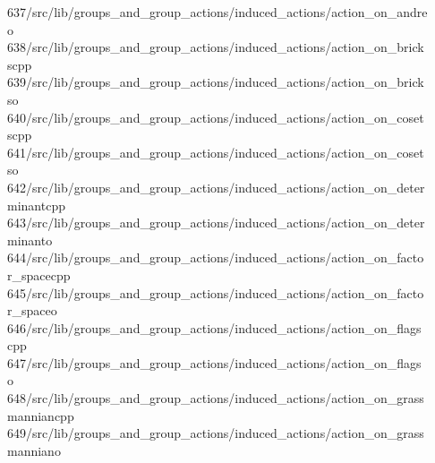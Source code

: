 \begin{tabbing}
637\>/src/lib/groups\_and\_group\_actions/induced\_actions/action\_on\_andre\\[0pt]
\>o\\[0pt]
638\>/src/lib/groups\_and\_group\_actions/induced\_actions/action\_on\_brick\\[0pt]
\>scpp\\[0pt]
639\>/src/lib/groups\_and\_group\_actions/induced\_actions/action\_on\_brick\\[0pt]
\>so\\[0pt]
640\>/src/lib/groups\_and\_group\_actions/induced\_actions/action\_on\_coset\\[0pt]
\>scpp\\[0pt]
641\>/src/lib/groups\_and\_group\_actions/induced\_actions/action\_on\_coset\\[0pt]
\>so\\[0pt]
642\>/src/lib/groups\_and\_group\_actions/induced\_actions/action\_on\_deter\\[0pt]
\>minantcpp\\[0pt]
643\>/src/lib/groups\_and\_group\_actions/induced\_actions/action\_on\_deter\\[0pt]
\>minanto\\[0pt]
644\>/src/lib/groups\_and\_group\_actions/induced\_actions/action\_on\_facto\\[0pt]
\>r\_spacecpp\\[0pt]
645\>/src/lib/groups\_and\_group\_actions/induced\_actions/action\_on\_facto\\[0pt]
\>r\_spaceo\\[0pt]
646\>/src/lib/groups\_and\_group\_actions/induced\_actions/action\_on\_flags\\[0pt]
\>cpp\\[0pt]
647\>/src/lib/groups\_and\_group\_actions/induced\_actions/action\_on\_flags\\[0pt]
\>o\\[0pt]
648\>/src/lib/groups\_and\_group\_actions/induced\_actions/action\_on\_grass\\[0pt]
\>manniancpp\\[0pt]
649\>/src/lib/groups\_and\_group\_actions/induced\_actions/action\_on\_grass\\[0pt]
\>manniano\\[0pt]

\end{tabbing}
